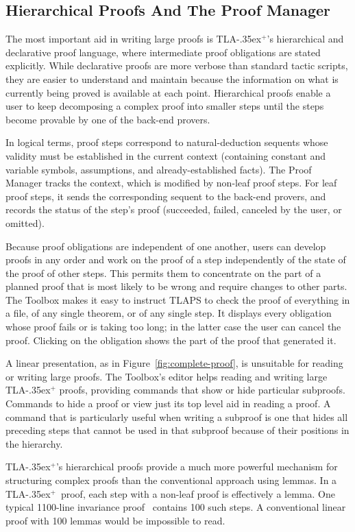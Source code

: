 \documentclass[a4paper]{llncs}
\newcommand{\tlaplus}{\mbox{TLA\kern -.35ex$^+$}\xspace}
\begin{document}
\subsection{Hierarchical Proofs And The Proof Manager}
\label{sec:hierarchy}

The most important aid in writing large proofs is \tlaplus's
hierarchical and declarative proof language, where intermediate proof
obligations are stated explicitly.  While declarative proofs are more
verbose than standard tactic scripts, they are easier to understand
and maintain because the information on what is currently being proved
is available at each point.  Hierarchical proofs enable a user to keep
decomposing a complex proof into smaller steps until the steps become
provable by one of the back-end provers.

In logical terms, proof steps correspond to natural-deduction sequents whose
validity must be established in the current context (containing constant and
variable symbols, assumptions, and already-established facts). The Proof Manager
tracks the context, which is modified by non-leaf proof steps. For leaf proof
steps, it sends the corresponding sequent to the back-end
provers, and records the status of the step's proof (succeeded, failed, canceled
by the user, or omitted).

Because proof obligations are independent of one another,
users can develop proofs in any order and work on the proof of a step
independently of the state of the proof of other steps.  This
permits them to concentrate on the part of a planned proof that is most likely
to be wrong and require changes to other parts.  The
Toolbox makes it easy to instruct TLAPS to check the proof of
everything in a file, of any single theorem, or of any single step.
It displays every obligation whose proof fails or
is taking too long; in the latter case the user can cancel the proof.
Clicking on the obligation shows the part of the proof that generated
it.

A linear presentation, as in Figure~\ref{fig:complete-proof}, is
unsuitable for reading or writing large proofs.  The Toolbox's editor helps
reading and writing large \tlaplus proofs, providing commands that
show or hide particular subproofs.  Commands to hide a proof
or view just its top level aid in reading a proof.  A
command that is particularly useful when writing a subproof is one
that hides all preceding steps that cannot be used in that subproof
because of their positions in the hierarchy.

\tlaplus's hierarchical proofs provide a much more powerful mechanism
for structuring complex proofs than the conventional approach using
lemmas.  In a \tlaplus\ proof, each step with a non-leaf proof is
effectively a lemma.  One typical 1100-line invariance
proof~\cite{lamport:byzantine-paxos}
contains 100 such steps.  A conventional linear proof with 100 lemmas
would be impossible to read.
\end{document}
